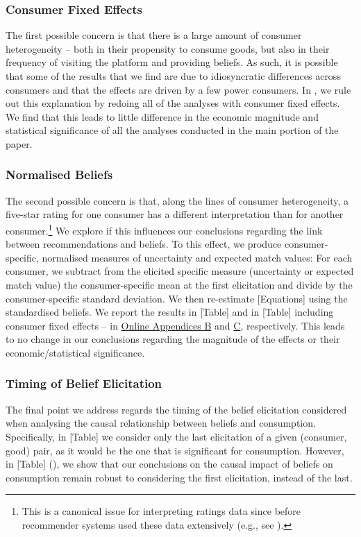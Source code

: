 \documentclass[12pt]{article}
\theoremstyle{newtheorem}
\begin{document}
\subsubsection{Consumer Fixed Effects} 
The first possible concern is that there is a large amount of consumer heterogeneity -- both in their propensity to consume goods, but also in their frequency of visiting the platform and providing beliefs. 
As such, it is possible that some of the results that we find are due to idiosyncratic differences across consumers and that the effects are driven by a few power consumers. 
In , we rule out this explanation by redoing all of the analyses with consumer fixed effects. 
We find that this leads to little difference in the economic magnitude and statistical significance of all the analyses conducted in the main portion of the paper.


\subsubsection{Normalised Beliefs} 
The second possible concern is that, along the lines of consumer heterogeneity, a five-star rating for one consumer has a different interpretation than for another consumer.\footnote{
    This is a canonical issue for interpreting ratings data since before recommender systems used these data extensively (e.g., see \citep{Greenleaf1992JMR}).
} 
We explore if this influences our conclusions regarding the link between recommendations and beliefs. 
To this effect, we produce consumer-specific, normalised measures of uncertainty and expected match values:
For each consumer, we subtract from the elicited specific measure (uncertainty or expected match value) the consumer-specific mean at the first elicitation and divide by the consumer-specific standard deviation. 
We then re-estimate [Equations] using the standardised beliefs. 
We report the results in [Table] and in [Table] including consumer fixed effects -- in \hyperref[online-appendix:additional-tables]{Online Appendices B} and \hyperref[online-appendix:tables-fe]{C}, respectively.
This leads to no change in our conclusions regarding the magnitude of the effects or their economic/statistical significance.


\subsubsection{Timing of Belief Elicitation} 
The final point we address regards the timing of the belief elicitation considered when analysing the causal relationship between beliefs and consumption. 
Specifically, in [Table] we consider only the last elicitation of a given (consumer, good) pair, as it would be the one that is significant for consumption.
However, in [Table] (), we show that our conclusions on the causal impact of beliefs on consumption remain robust to considering the first elicitation, instead of the last.
\end{document}
